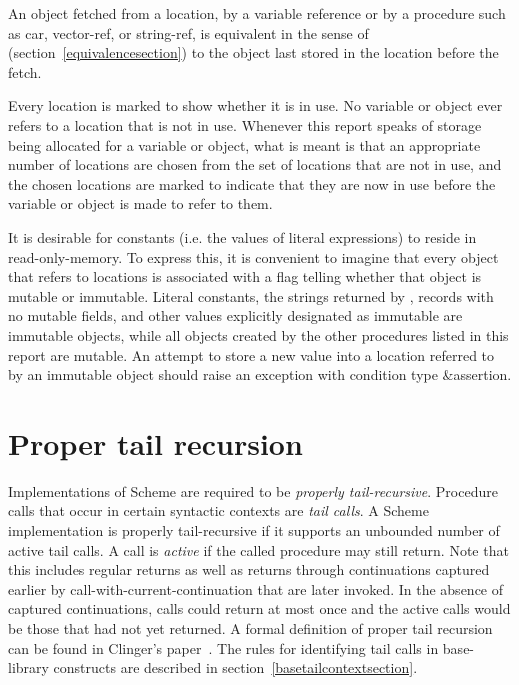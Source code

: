 An object fetched from a location, by a variable reference or by
a procedure such as {\cf car}, {\cf vector-ref}, or {\cf string-ref}, is
equivalent in the sense of  %
(section~\ref{equivalencesection})
to the object last stored in the location before the fetch.

Every location is marked to show whether it is in use.
No variable or object ever refers to a location that is not in use.
Whenever this report speaks of storage being allocated for a variable
or object, what is meant is that an appropriate number of locations are
chosen from the set of locations that are not in use, and the chosen
locations are marked to indicate that they are now in use before the variable
or object is made to refer to them.

It is desirable for constants (i.e. the values of
literal expressions) to reside in read-only-memory.  To express this,
it is convenient to imagine that every object that refers to locations
is associated with a flag telling whether that object is
mutable or immutable.  Literal
constants, the strings returned by , records with
no mutable fields, and other values explicitly designated as immutable
are immutable objects, while all objects created by the other
procedures listed in this report are mutable.  An attempt to store a
new value into a location referred to by an immutable object
should raise an exception with condition type {\cf\&assertion}.


\section{Proper tail recursion}
\label{proper tail recursion}

Implementations of Scheme are required to be
{\em properly tail-recursive}.
Procedure calls that occur in certain syntactic
contexts are \textit{tail calls}.  A Scheme implementation is
properly tail-recursive if it supports an unbounded number of active
tail calls.  A call is {\em active} if the called procedure may still
return.  Note that this includes regular returns as well as returns
through continuations captured earlier by
{\cf call-with-current-continuation} that are later invoked.
In the absence of captured continuations, calls could
return at most once and the active calls would be those that had not
yet returned.
A formal definition of proper tail recursion can be found
in Clinger's paper~\cite{propertailrecursion}.  The rules for identifying tail calls
in base-library constructs are described in
section~\ref{basetailcontextsection}.

